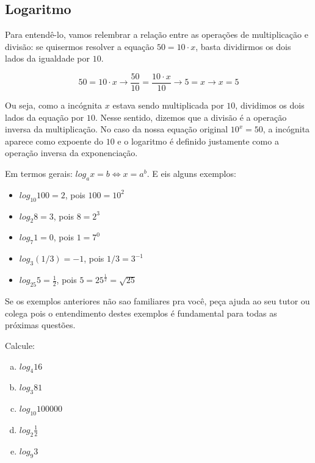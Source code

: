 \documentclass[main.tex]{subfiles}
\begin{document}
\subsection*{Logaritmo}

Para entendê-lo, vamos relembrar a relação entre as operações de multiplicação e divisão: se quisermos resolver a equação $50=10 \cdot x$, basta dividirmos os dois lados da igualdade por $10$.

$$
50=10 \cdot x \longrightarrow \frac{50}{10}=\frac{10 \cdot x}{10} \longrightarrow 5=x \longrightarrow x=5
$$

Ou seja, como a incógnita $x$ estava sendo multiplicada por $10$, dividimos os dois lados da equação por $10$. Nesse sentido, dizemos que a divisão é a operação inversa da multiplicação. No caso da nossa equação original $10^x=50$, a incógnita aparece como expoente do $10$ e o logaritmo é definido justamente como a operação inversa da exponenciação.

\begin{caixaExemplo}
Em termos gerais: $log_a x = b \Leftrightarrow x=a^b$. E eis alguns exemplos:

\begin{itemize}
 \item $log_{10} 100 = 2$, pois $100=10^2$
 \item $log_2 8 = 3$, pois $8=2^3$
 \item $log_7 1 = 0$, pois $1=7^0$
 \item $log_3 (1/3) = -1$, pois $1/3=3^{-1}$
 \item $log_{25} 5 = \frac{1}{2}$, pois $5=25^{\frac{1}{2}}=\sqrt{25}$
\end{itemize}
\end{caixaExemplo}

Se os exemplos anteriores não sao familiares pra você, peça ajuda ao seu tutor ou colega pois o entendimento destes exemplos é fundamental para todas as próximas questões.

\begin{questao}
Calcule:
\begin{enumerate}[a)]
\item $log_4 16$
\item $log_3 81$
\item $log_{10} 100000$
\item $log_2 \frac{1}{2}$
\item $log_9 3$
\end{enumerate}
\end{questao}
\end{document}
